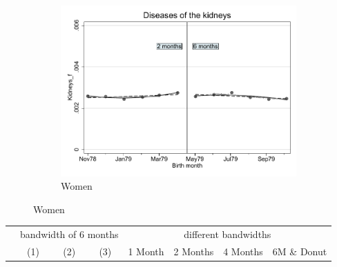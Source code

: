 \documentclass[a4paper ]{article}
\begin{document}
\begin{figure}[h]
\begin{subfigure}[t]{0.31\textwidth}
		\centering
		\includegraphics[width=0.99\textwidth]{R1_RD_Kidneys_f_fits}
		\caption{Women}
	\end{subfigure}
\end{figure}


\begin{table}[h]\centering
\def\sym#1{\ifmmode^{#1}\else\(^{#1}\)\fi}
\begin{tabular}{l*{3}{c}|cccc}
\toprule
&\multicolumn{3}{c}{bandwidth of 6 months} & \multicolumn{4}{c}{different bandwidths} \\
 \cmidrule(lr{1em}){2-4} \cmidrule(lr{1em}){5-8}
 &\multicolumn{1}{c}{(1)}&\multicolumn{1}{c}{(2)}&\multicolumn{1}{c}{(3)}& 1 Month & 2 Months & 4 Months & 6M \& Donut \\
\midrule 

\bottomrule
\end{tabular}
\end{table}
\end{document}
